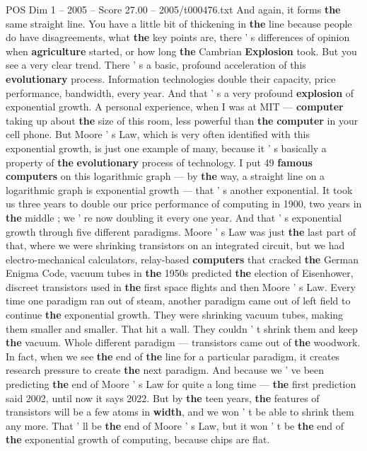 \begin{textsample}{POS Dim 1 – 2005 – Score 27.00 – 2005/t000476.txt}
And again, it forms \textbf{the} same straight line.
You have a little bit of thickening in \textbf{the} line because people do have disagreements, what \textbf{the} key points are, there ' s differences of opinion when \textbf{agriculture} started, or how long \textbf{the} Cambrian \textbf{Explosion} took.
But you see a very clear trend.
There ' s a basic, profound acceleration of this \textbf{evolutionary} process.
Information technologies double their capacity, price performance, bandwidth, every year.
And that ' s a very profound \textbf{explosion} of exponential growth.
A personal experience, when I was at MIT — \textbf{computer} taking up about \textbf{the} size of this room, less powerful than \textbf{the} \textbf{computer} in your cell phone.
But Moore ' s Law, which is very often identified with this exponential growth, is just one example of many, because it ' s basically a property of \textbf{the} \textbf{evolutionary} process of technology.
I put 49 \textbf{famous} \textbf{computers} on this logarithmic graph — by \textbf{the} way, a straight line on a logarithmic graph is exponential growth — that ' s another exponential.
It took us three years to double our price performance of computing in 1900, two years in \textbf{the} middle ; we ' re now doubling it every one year.
And that ' s exponential growth through five different paradigms.
Moore ' s Law was just \textbf{the} last part of that, where we were shrinking transistors on an integrated circuit, but we had electro-mechanical calculators, relay-based \textbf{computers} that cracked \textbf{the} German Enigma Code, vacuum tubes in \textbf{the} 1950s predicted \textbf{the} election of Eisenhower, discreet transistors used in \textbf{the} first space flights and then Moore ' s Law.
Every time one paradigm ran out of steam, another paradigm came out of left field to continue \textbf{the} exponential growth.
They were shrinking vacuum tubes, making them smaller and smaller.
That hit a wall.
They couldn ' t shrink them and keep \textbf{the} vacuum.
Whole different paradigm — transistors came out of \textbf{the} woodwork.
In fact, when we see \textbf{the} end of \textbf{the} line for a particular paradigm, it creates research pressure to create \textbf{the} next paradigm.
And because we ' ve been predicting \textbf{the} end of Moore ' s Law for quite a long time — \textbf{the} first prediction said 2002, until now it says 2022.
But by \textbf{the} teen years, \textbf{the} features of transistors will be a few atoms in \textbf{width}, and we won ' t be able to shrink them any more.
That ' ll be \textbf{the} end of Moore ' s Law, but it won ' t be \textbf{the} end of \textbf{the} exponential growth of computing, because chips are flat.

\end{textsample}
